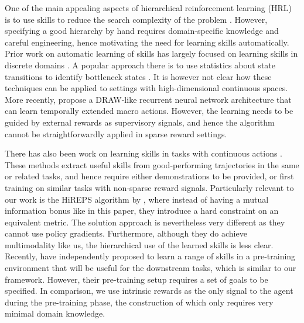 \documentclass{article} %
\begin{document}
One of the main appealing aspects of hierarchical reinforcement learning (HRL) is to use skills to reduce the search complexity of the problem \citep{parr1998reinforcement, sutton1999between, dietterich2000hierarchical}.
However, specifying a good hierarchy by hand requires domain-specific knowledge and careful engineering, hence motivating the need for learning skills automatically. Prior work on automatic learning of skills has largely focused on learning skills in discrete domains \citep{chentanez2004intrinsically, vigorito2010intrinsically}.
A popular approach there is to use statistics about state transitions to identify bottleneck states \citep{stolle2002learning, mannor2004dynamic, csimcsek2005identifying}.
It is however not clear how these techniques can be applied to settings with high-dimensional continuous spaces.
More recently, \cite{mnih2016strategic} propose a DRAW-like \citep{gregor2015draw} recurrent neural network architecture that can learn temporally extended macro actions.
However, the learning needs to be guided by external rewards as supervisory signals, and hence the algorithm cannot be straightforwardly applied in sparse reward settings.%

There has also been work on learning skills in tasks with continuous actions  \citep{schaal2005learning, konidaris2011autonomous, daniel2013autonomous, ranchod2015nonparametric}.
These methods extract useful skills from good-performing trajectories in the same or related tasks, and hence require either demonstrations to be provided, or first training on similar tasks with non-sparse reward signals. Particularly relevant to our work is the HiREPS algorithm by \cite{daniel2012hierarchical}, where instead of having a mutual information bonus like in this paper, they introduce a hard constraint on an equivalent metric. The solution approach is nevertheless very different as they cannot use policy gradients. Furthermore, although they do achieve multimodality like us, the hierarchical use of the learned skills is less clear. Recently, \cite{heess2016learning} have independently proposed to learn a range of skills in a pre-training environment that will be useful for the downstream tasks, which is similar to our framework.
However, their pre-training setup requires a set of goals to be specified.
In comparison, we use intrinsic rewards as the only signal to the agent during the pre-training phase, the construction of which only requires very minimal domain knowledge.%
\end{document}
